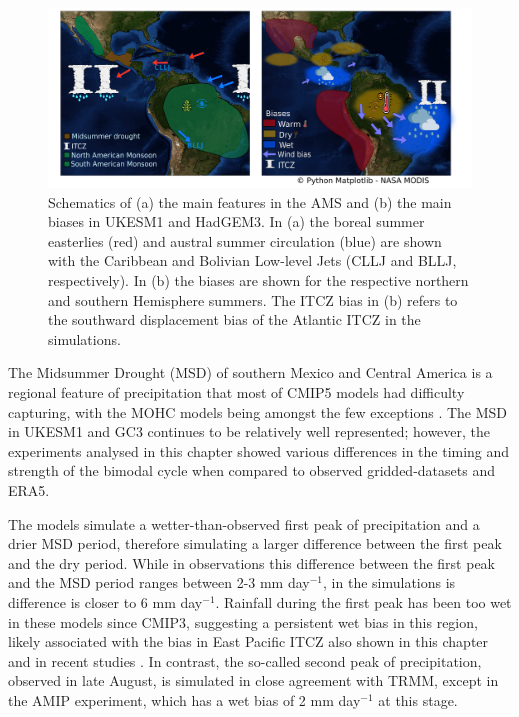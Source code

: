 \begin{figure}[t!]
\centering
 \includegraphics[width=\linewidth]{figures/drawing_d}
\caption[Summary schematic of biases in UKESM1 and HadGEM3]{Schematics of (a) the main features in the AMS and (b) the main biases in UKESM1 and HadGEM3. In (a) the boreal summer easterlies (red) and austral summer circulation (blue) are shown with the Caribbean and Bolivian Low-level Jets (CLLJ and BLLJ, respectively). In (b) the biases are shown for the respective northern and southern Hemisphere summers. The ITCZ bias in (b) refers to the southward displacement bias of the Atlantic ITCZ in the simulations.  }
\label{fig:13}
\end{figure}

    The Midsummer Drought (MSD) of southern Mexico and Central America is a regional feature of precipitation that most of CMIP5 models had difficulty capturing, with the MOHC models being amongst the few exceptions \citep{ryu2014}. 
The MSD in UKESM1 and GC3 continues to be relatively well represented; however, the experiments analysed in this chapter showed various  differences in the timing and strength of the bimodal cycle when compared to observed gridded-datasets and ERA5.  

The models simulate a wetter-than-observed first peak of precipitation and a drier MSD period, therefore simulating a larger difference between the first peak and the dry period. While in observations this difference  between the first peak and the MSD period ranges between 2-3 mm day$^{-1}$, in the simulations is difference is closer to 6 mm day$^{-1}$.
Rainfall during the first peak has been too wet in these models since CMIP3, suggesting a persistent wet bias in this region, likely associated with the bias in East Pacific ITCZ also shown in this chapter and in recent studies \citep{ryu2014,mulcahy2018}. 
In contrast, the so-called second peak of precipitation, observed in late August, is simulated in close agreement with TRMM, except in the AMIP experiment, which has a wet bias of 2 mm day$^{-1}$ at this stage.

